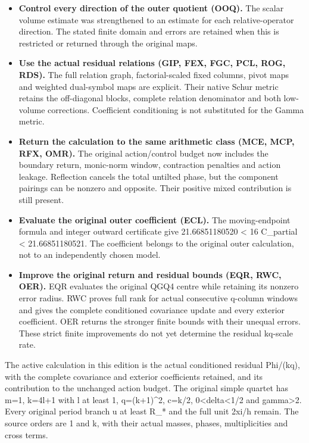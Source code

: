 \documentclass[
]{article}
\providecommand{\tightlist}{%
  \setlength{\itemsep}{0pt}\setlength{\parskip}{0pt}}
\begin{document}
\begin{itemize}
\tightlist
\item
  \textbf{Control every direction of the outer quotient (OOQ).} The
  scalar volume estimate was strengthened to an estimate for each
  relative-operator direction. The stated finite domain and errors are
  retained when this is restricted or returned through the original
  maps.
\item
  \textbf{Use the actual residual relations (GIP, FEX, FGC, PCL, ROG,
  RDS).} The full relation graph, factorial-scaled fixed columns, pivot
  maps and weighted dual-symbol maps are explicit. Their native Schur
  metric retains the off-diagonal blocks, complete relation denominator
  and both low-volume corrections. Coefficient conditioning is not
  substituted for the Gamma metric.
\item
  \textbf{Return the calculation to the same arithmetic class (MCE, MCP,
  RFX, OMR).} The original action/control budget now includes the
  boundary return, monic-norm window, contraction penalties and action
  leakage. Reflection cancels the total untilted phase, but the
  component pairings can be nonzero and opposite. Their positive mixed
  contribution is still present.
\item
  \textbf{Evaluate the original outer coefficient (ECL).} The
  moving-endpoint formula and integer outward certificate give
  21.66851180520 \textless{} 16 C\_partial \textless{} 21.66851180521.
  The coefficient belongs to the original outer calculation, not to an
  independently chosen model.
\item
  \textbf{Improve the original return and residual bounds (EQR, RWC,
  OER).} EQR evaluates the original QGQ4 centre while retaining its
  nonzero error radius. RWC proves full rank for actual consecutive
  q-column windows and gives the complete conditioned covariance update
  and every exterior coefficient. OER returns the stronger finite bounds
  with their unequal errors. These strict finite improvements do not yet
  determine the residual kq-scale rate.
\end{itemize}

The active calculation in this edition is the actual conditioned
residual Phi/(kq), with the complete covariance and exterior
coefficients retained, and its contribution to the unchanged action
budget. The original simple quartet has m=1, k=4l+1 with l at least 1,
q=(k+1)\^{}2, c=k/2, 0\textless delta\textless1/2 and
gamma\textgreater2. Every original period branch \textbar u\textbar{} at
least R\_* and the full unit 2xi/h remain. The source orders are 1 and
k, with their actual masses, phases, multiplicities and cross terms.
\end{document}
